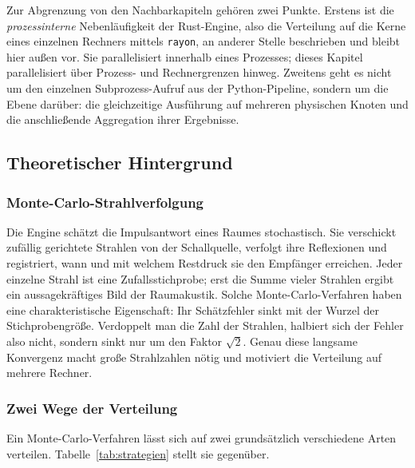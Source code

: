Zur Abgrenzung von den Nachbarkapiteln gehören zwei Punkte. Erstens ist die
\emph{prozessinterne} Nebenläufigkeit der Rust-Engine, also die Verteilung auf
die Kerne eines einzelnen Rechners mittels \texttt{rayon}, an anderer Stelle
beschrieben und bleibt hier außen vor. Sie parallelisiert innerhalb eines
Prozesses; dieses Kapitel parallelisiert über Prozess- und Rechnergrenzen hinweg.
Zweitens geht es nicht um den einzelnen Subprozess-Aufruf aus der Python-Pipeline,
sondern um die Ebene darüber: die gleichzeitige Ausführung auf mehreren physischen
Knoten und die anschließende Aggregation ihrer Ergebnisse.

\subsection{Theoretischer Hintergrund}
\label{subsec:cluster-theorie}

\subsubsection{Monte-Carlo-Strahlverfolgung}
\label{subsubsec:mc}

Die Engine schätzt die Impulsantwort eines Raumes stochastisch. Sie verschickt
zufällig gerichtete Strahlen von der Schallquelle, verfolgt ihre Reflexionen und
registriert, wann und mit welchem Restdruck sie den Empfänger erreichen. Jeder
einzelne Strahl ist eine Zufallsstichprobe; erst die Summe vieler Strahlen ergibt
ein aussagekräftiges Bild der Raumakustik. Solche Monte-Carlo-Verfahren haben eine
charakteristische Eigenschaft: Ihr Schätzfehler sinkt mit der Wurzel der
Stichprobengröße. Verdoppelt man die Zahl der Strahlen, halbiert sich der Fehler
also nicht, sondern sinkt nur um den Faktor $\sqrt{2}$. Genau diese langsame
Konvergenz macht große Strahlzahlen nötig und motiviert die Verteilung auf mehrere
Rechner.

\subsubsection{Zwei Wege der Verteilung}
\label{subsubsec:strategien}

Ein Monte-Carlo-Verfahren lässt sich auf zwei grundsätzlich verschiedene Arten
verteilen. Tabelle~\ref{tab:strategien} stellt sie gegenüber.

